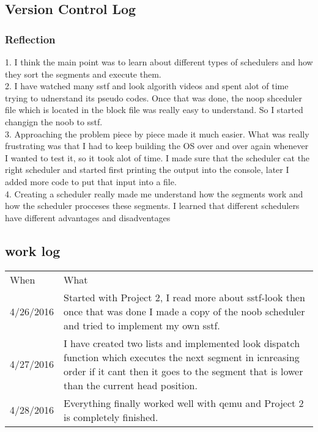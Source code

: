 \documentclass[letterpaper,10pt,draftclsnofoot,onecolumn]{IEEEtran}
\begin{document}
\subsection*{Version Control Log}


\subsubsection*{Reflection}
	1. I think the main point was to learn about different types of schedulers and how they sort the segments and execute them.\\
	2. I have watched many sstf and look algorith videos and spent alot of time trying to udnerstand its pseudo codes. Once that was done, the noop shceduler file which is located in the block file was really easy to understand. So I started changign the noob to sstf.\\
	3. Approaching the problem piece by piece made it much easier. What was really frustrating was that I had to keep building the OS over and over again whenever I wanted to test it, so it took alot of time. I made sure that the scheduler cat the right scheduler and started first printing the output into the console, later I added more code to put that input into a file.\\
	4. Creating a scheduler really made me understand how the segments work and how the scheduler procceses these segments. I learned that different schedulers have different advantages and disadventages\\

\subsection*{work log}
\begin{center}
\begin{tabular}{ |m{2cm}|m{5cm}| }
\hline
When & What \\
4/26/2016 & Started with Project 2, I read more about sstf-look then once that was done I made a copy of the noob scheduler and tried to implement my own sstf.\\
4/27/2016 & I have created two lists and implemented look dispatch function which executes the next segment in icnreasing order if it cant then it goes to the segment that is lower than the current head position.\\
4/28/2016 & Everything finally worked well with qemu and Project 2 is completely finished.\\
\hline
\end{tabular}
\end{center}
\end{document}
